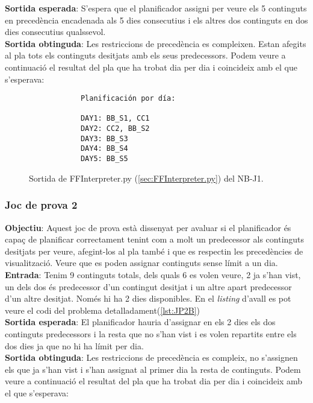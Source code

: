 \documentclass[a4paper]{article}
\begin{document}
	\noindent \textbf{Sortida esperada}: S'espera que el planificador assigni per veure els 5 continguts en precedència encadenada als 5 dies consecutius i els altres dos continguts en dos dies consecutius qualssevol. \\
	
	\noindent \textbf{Sortida obtinguda}: Les restriccions de  precedència es compleixen. Estan afegits al pla tots els continguts desitjats amb els seus predecessors. Podem veure a continuació el resultat del pla que ha trobat dia per dia i coincideix amb el que s'esperava:
	
	\begin{figure}[H]
		\centering
		\begin{verbatim}
			Planificación por día:
			
			DAY1: BB_S1, CC1
			DAY2: CC2, BB_S2
			DAY3: BB_S3
			DAY4: BB_S4
			DAY5: BB_S5		
		\end{verbatim}
		\caption{Sortida de FFInterpreter.py (\ref{sec:FFInterpreter.py}) del NB-J1.}
	\end{figure}
	
	
	\subsubsection*{Joc de prova 2}
	\noindent \textbf{Objectiu}: Aquest joc de prova està dissenyat per avaluar si el planificador és capaç de planificar correctament tenint com a molt un predecessor als continguts desitjats per veure, afegint-los al pla també i que es respectin les precedències de visualització. Veure que es poden assignar continguts sense límit a un dia. \\
	
	\noindent \textbf{Entrada}: Tenim 9 continguts totals, dels quals 6 es volen veure, 2 ja s'han vist, un dels dos és predecessor d'un contingut desitjat i un altre apart predecessor d'un altre desitjat. Només hi ha 2 dies disponibles. En el \textit{listing} d'avall es pot veure el codi del problema detalladament(\ref{lst:JP2B}) \\
	
	\noindent \textbf{Sortida esperada}: El planificador hauria d'assignar en els 2 dies els dos continguts predecessors i la resta que no s'han vist i es volen repartits entre els dos dies ja que no hi ha límit per dia. \\
	
	\noindent \textbf{Sortida obtinguda}: Les restriccions de precedència es compleix, no s'assignen els que ja s'han vist i s'han assignat al primer dia la resta de continguts. Podem veure a continuació el resultat del pla que ha trobat dia per dia i coincideix amb el que s'esperava:
	
\end{document}
